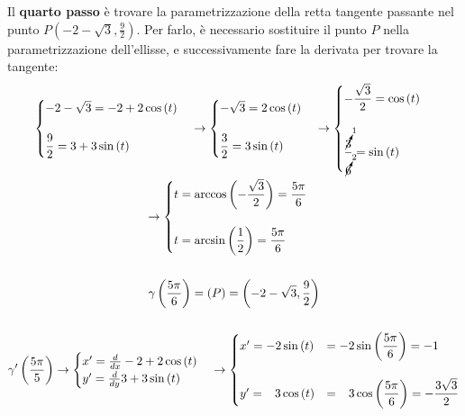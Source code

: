 \documentclass[a4paper]{article}
\begin{document}
	Il \textbf{quarto passo} è trovare la parametrizzazione della retta tangente passante nel punto $P\left(-2-\sqrt{3}, \frac{9}{2}\right)$. Per farlo, è necessario sostituire il punto $P$ nella parametrizzazione dell'ellisse, e successivamente fare la derivata per trovare la tangente:
	\begin{gather*}
		\begin{cases}
			-2-\sqrt{3} = -2 + 2\cos\left(t\right) \\
			\\
			\dfrac{9}{2} = 3 + 3\sin\left(t\right)
		\end{cases}
		\rightarrow
		\begin{cases}
			-\sqrt{3} = 2\cos\left(t\right) \\
			\\
			\dfrac{3}{2} = 3\sin\left(t\right)
		\end{cases}
		\rightarrow
		\begin{cases}
			-\dfrac{\sqrt{3}}{2} = \cos\left(t\right) \\
			\\
			\dfrac{\cancelto{1}{3}}{\cancelto{2}{6}} = \sin\left(t\right)
		\end{cases} \\
		\rightarrow
		\begin{cases}
			t = \arccos\left(-\dfrac{\sqrt{3}}{2}\right) = \dfrac{5\pi}{6} \\
			\\
			t = \arcsin\left(\dfrac{1}{2}\right) = \dfrac{5\pi}{6}
		\end{cases}\\
		\\
		\gamma\left(\dfrac{5\pi}{6}\right) = \left(P\right) = \left(-2-\sqrt{3}, \dfrac{9}{2}\right) \\
		\\
		\gamma'\left(\dfrac{5\pi}{5}\right) \rightarrow \begin{cases}
			x' = \frac{d}{dx} -2 + 2 \cos\left(t\right) \\
			y' = \frac{d}{dy} 3 + 3 \sin\left(t\right)
		\end{cases}
		\rightarrow
		\begin{cases}
			x' = - 2\sin\left(t\right) & = -2\sin\left(\dfrac{5\pi}{6}\right) = -1 \\
			\\
			y' = \phantom{-}3\cos\left(t\right)   & = \phantom{-}3\cos\left(\dfrac{5\pi}{6}\right) = -\dfrac{3\sqrt{3}}{2}
		\end{cases}
	\end{gather*}\newpage
\end{document}
